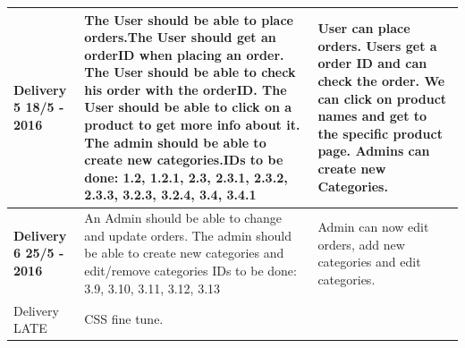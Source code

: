 \documentclass[a4paper,12pt]{article}
\begin{document}
\begin{table}[htbp]
\begin{tabular}{|L{4cm}|L{7cm}|L{4cm}|}
		\textbf{Delivery 5 18/5 - 2016} & The User should be able to place orders.\newline The User should get an orderID when placing an order. \newline The User should be able to check his order with the orderID. \newline The User should be able to click on a product to get more info about it. \newline The admin should be able to create new categories.\newline IDs to be done: 1.2, 1.2.1, 2.3, 2.3.1, 2.3.2, 2.3.3, 3.2.3, 3.2.4, 3.4, 3.4.1 & User can place orders. \newline Users get a order ID and can check the order. \newline We can click on product names and get to the specific product page. \newline Admins can create new Categories.            \\ \hline
		\textbf{Delivery 6 25/5 - 2016} &  An Admin should be able to change and update orders. \newline The admin should be able to create new categories and edit/remove categories \newline IDs to be done: 3.9, 3.10, 3.11, 3.12, 3.13 & Admin can now edit orders, add new categories and edit categories.                   \\ \hline
		Delivery LATE &  CSS fine tune. \newline 		&		\\ \hline
	\end{tabular}
\end{table}
\end{document}
